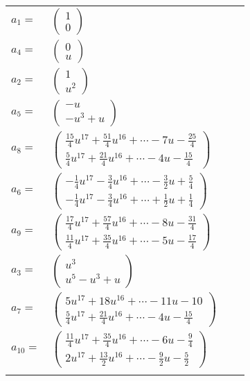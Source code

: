 \documentclass[1p]{elsarticle_modified}
\theoremstyle{definition}
\begin{document}
\begin{tabular}{m{7pt} m{180pt} m{7pt} m{180pt} }
\flushright $a_{1}=$&$\begin{pmatrix}1\\0\end{pmatrix}$ \\
\flushright $a_{4}=$&$\begin{pmatrix}0\\u\end{pmatrix}$ \\
\flushright $a_{2}=$&$\begin{pmatrix}1\\u^2\end{pmatrix}$ \\
\flushright $a_{5}=$&$\begin{pmatrix}- u\\- u^3+u\end{pmatrix}$ \\
\flushright $a_{8}=$&$\begin{pmatrix}\frac{15}{4} u^{17}+\frac{51}{4} u^{16}+\cdots-7 u-\frac{25}{4}\\\frac{5}{4} u^{17}+\frac{21}{4} u^{16}+\cdots-4 u-\frac{15}{4}\end{pmatrix}$ \\
\flushright $a_{6}=$&$\begin{pmatrix}-\frac{1}{4} u^{17}-\frac{3}{4} u^{16}+\cdots-\frac{3}{2} u+\frac{5}{4}\\-\frac{1}{4} u^{17}-\frac{3}{4} u^{16}+\cdots+\frac{1}{2} u+\frac{1}{4}\end{pmatrix}$ \\
\flushright $a_{9}=$&$\begin{pmatrix}\frac{17}{4} u^{17}+\frac{57}{4} u^{16}+\cdots-8 u-\frac{31}{4}\\\frac{11}{4} u^{17}+\frac{35}{4} u^{16}+\cdots-5 u-\frac{17}{4}\end{pmatrix}$ \\
\flushright $a_{3}=$&$\begin{pmatrix}u^3\\u^5- u^3+u\end{pmatrix}$ \\
\flushright $a_{7}=$&$\begin{pmatrix}5 u^{17}+18 u^{16}+\cdots-11 u-10\\\frac{5}{4} u^{17}+\frac{21}{4} u^{16}+\cdots-4 u-\frac{15}{4}\end{pmatrix}$ \\
\flushright $a_{10}=$&$\begin{pmatrix}\frac{11}{4} u^{17}+\frac{35}{4} u^{16}+\cdots-6 u-\frac{9}{4}\\2 u^{17}+\frac{13}{2} u^{16}+\cdots-\frac{9}{2} u-\frac{5}{2}\end{pmatrix}$\\&\end{tabular}
\end{document}
